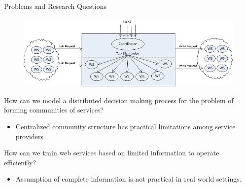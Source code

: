 \documentclass{beamer}
\begin{document}
\begin{frame}{Problems and Research Questions}
    \begin{figure}[htbp]
        \centering
        \includegraphics[width=1.0 \columnwidth]{figures/rq2.png}
    \end{figure}

    \footnotesize{\colorbox{blue}{\color{white}{R4}} How can we model a distributed decision making process for the problem of forming communities of services?}\\
        \begin{itemize}
            \item Centralized community structure has practical limitations among service providers
        \end{itemize}
    \vspace{0.3cm} \colorbox{blue}{\color{white}{R5}} How can we train web services based on limited information to operate efficiently?\\
        \begin{itemize}
            \item Assumption of complete information is not practical in real world settings.
        \end{itemize}
\end{frame}
\end{document}
